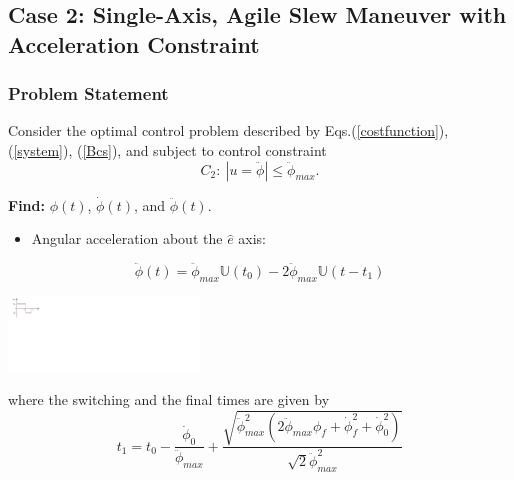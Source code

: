 \documentclass[letterpaper, preprint, paper,11pt]{AAS}	%
\begin{document}
		
	\subsection{Case 2: Single-Axis, Agile Slew Maneuver with Acceleration Constraint} 
	
		\subsubsection{Problem Statement} 
			
			Consider the optimal control problem described by Eqs.(\ref{costfunction}), (\ref{system}), (\ref{Bcs}), and subject to control constraint
			\begin{equation}
				C_2: \ |u=\ddot{\phi}|\leq \ddot{\phi}_{max}.
			\end{equation}
			
			{\bf Find:} $\phi(t)$, $\dot{\phi}(t)$, and $\ddot{\phi}(t)$.
				
				
			\begin{itemize}
				\item Angular acceleration about the $\hat{e}$ axis:
			\end{itemize}
			\begin{equation}\label{alpha}
			\ddot{\phi}(t)=\ddot{\phi}_{max}\mathbb{U}(t_0)- 2\ddot{\phi}_{max}\mathbb{U}(t-t_1)
			\end{equation}
			
			\begin{center}
				\includegraphics[width=2in]{./Figures/Bang_bang}      
			\end{center}
			
			where the switching and the final times are given by
			\begin{equation}
				t_1=t_0-\frac{\dot{\phi}_{0}}{\ddot{\phi}_{max}}+\frac{\sqrt{\ddot{\phi}_{max}^2(2\ddot{\phi}_{max}\phi_{f}+\dot{\phi}_{f}^2+\dot{\phi}_{0}^2)}}{\sqrt{2}\ddot{\phi}_{max}^2}
			\end{equation}
			
\end{document}
